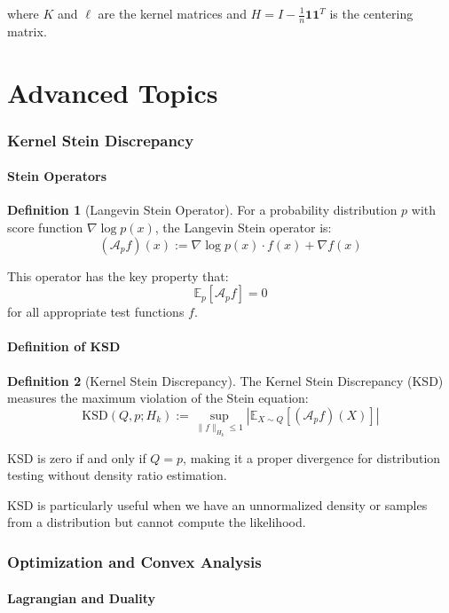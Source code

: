 \documentclass[12pt,a4paper]{article}
\theoremstyle{definition}
\newtheorem{definition}{Definition}[section]
\begin{document}
where $K$ and $\ell$ are the kernel matrices and $H = I - \frac{1}{n}\mathbf{1}\mathbf{1}^T$ is the centering matrix.

\newpage
\part{Advanced Topics}

\section{Kernel Stein Discrepancy}

\subsection{Stein Operators}

\begin{definition}[Langevin Stein Operator]
For a probability distribution $p$ with score function $\nabla \log p(x)$, the Langevin Stein operator is:
\[
(\mathcal{A}_p f)(x) := \nabla \log p(x) \cdot f(x) + \nabla f(x)
\]

This operator has the key property that:
\[
\mathbb{E}_p[\mathcal{A}_p f] = 0
\]
for all appropriate test functions $f$.
\end{definition}

\subsection{Definition of KSD}

\begin{definition}[Kernel Stein Discrepancy]
The Kernel Stein Discrepancy (KSD) measures the maximum violation of the Stein equation:
\[
\text{KSD}(Q, p; H_k) := \sup_{\|f\|_{H_k} \leq 1} \left| \mathbb{E}_{X \sim Q}[(\mathcal{A}_p f)(X)] \right|
\]

KSD is zero if and only if $Q = p$, making it a proper divergence for distribution testing without density ratio estimation.
\end{definition}

KSD is particularly useful when we have an unnormalized density or samples from a distribution but cannot compute the likelihood.

\section{Optimization and Convex Analysis}

\subsection{Lagrangian and Duality}
\end{document}
